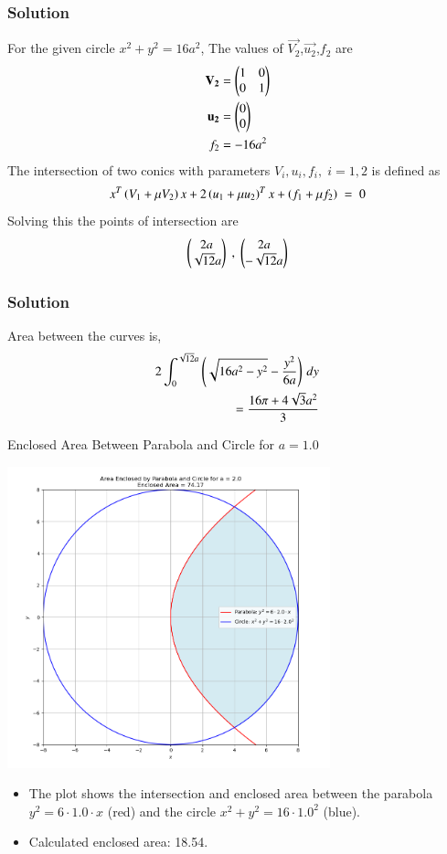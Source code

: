 \documentclass{beamer}
\begin{document}
\begin{frame}
\frametitle{Solution}
For the given circle $x^2+y^2=16a^2$, The values of $\vec{V_2}$,$\vec{u_2}$,$f_2$ are
\begin{align}
\mathbf{V_2}&=\begin{pmatrix}1 & 0\\0 & 1\end{pmatrix}\\
\mathbf{u_2}&=\begin{pmatrix}0\\0\end{pmatrix}\\
f_2&=-16a^2
\end{align}
The intersection of two conics with parameters $V_i,u_i,f_i,\;i= 1,2$ is defined as
\begin{align}
x^T\left(V_1+\mu V_2\right)x+2\left(u_1+\mu u_2\right)^T x + \left(f_1+\mu f_2\right)\;=\;0
\end{align}
Solving this the points of intersection are
\begin{align}
\begin{pmatrix}2a\\\sqrt{12}a\end{pmatrix}\;,\;\begin{pmatrix}2a\\-\sqrt{12}a\end{pmatrix}
\end{align}
\end{frame}
\begin{frame}
\frametitle{Solution}
Area between the curves is,
\begin{align}
2\int_{0}^{\sqrt{12}a} \left(\sqrt{16a^2-y^2}-\frac{y^2}{6a}\right) \, dy \\
=\frac{16\pi+4\sqrt{3}a^2}{3}
\end{align}

\end{frame}
\begin{frame}{Enclosed Area Between Parabola and Circle for \( a = 1.0 \)}
    \begin{center}
        \includegraphics[width=0.7\textwidth]{figs/fig_2.png}
    \end{center}
    \vspace{0.5cm}
    \begin{itemize}
        \item The plot shows the intersection and enclosed area between the parabola \( y^2 = 6 \cdot 1.0 \cdot x \) (red) and the circle \( x^2 + y^2 = 16 \cdot 1.0^2 \) (blue).
        \item Calculated enclosed area: 18.54.
    \end{itemize}
\end{frame}
\end{document}
